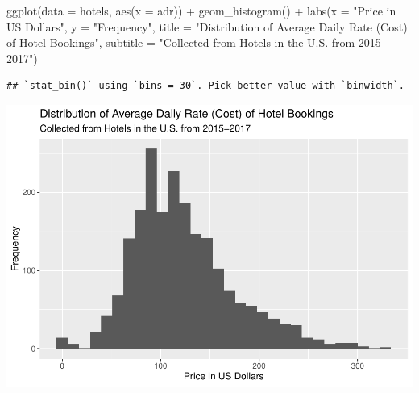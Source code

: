 \documentclass[
]{article}
\newenvironment{Shaded}{\begin{snugshade}}{\end{snugshade}}
\newcommand{\AttributeTok}[1]{\textcolor[rgb]{0.77,0.63,0.00}{#1}}
\newcommand{\FunctionTok}[1]{\textcolor[rgb]{0.00,0.00,0.00}{#1}}
\newcommand{\NormalTok}[1]{#1}
\newcommand{\OtherTok}[1]{\textcolor[rgb]{0.56,0.35,0.01}{#1}}
\newcommand{\SpecialCharTok}[1]{\textcolor[rgb]{0.00,0.00,0.00}{#1}}
\newcommand{\StringTok}[1]{\textcolor[rgb]{0.31,0.60,0.02}{#1}}
\begin{document}
\begin{Shaded}
\end{Shaded}

\begin{Shaded}
\begin{Highlighting}[]
\FunctionTok{ggplot}\NormalTok{(}\AttributeTok{data =}\NormalTok{ hotels, }\FunctionTok{aes}\NormalTok{(}\AttributeTok{x =}\NormalTok{ adr)) }\SpecialCharTok{+}
  \FunctionTok{geom\_histogram}\NormalTok{() }\SpecialCharTok{+} 
  \FunctionTok{labs}\NormalTok{(}\AttributeTok{x =} \StringTok{"Price in US Dollars"}\NormalTok{,}
       \AttributeTok{y =} \StringTok{"Frequency"}\NormalTok{, }
       \AttributeTok{title =} \StringTok{"Distribution of Average Daily Rate (Cost) of Hotel Bookings"}\NormalTok{,}
       \AttributeTok{subtitle =} \StringTok{"Collected from Hotels in the U.S. from 2015{-}2017"}\NormalTok{)}
\end{Highlighting}
\end{Shaded}

\begin{verbatim}
## `stat_bin()` using `bins = 30`. Pick better value with `binwidth`.
\end{verbatim}

\includegraphics{written_report_files/figure-latex/response-plot-1.pdf}
\end{document}

